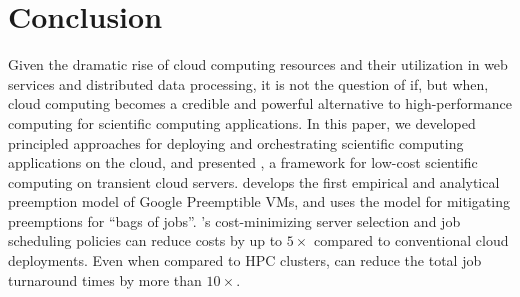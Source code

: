 
\section{Conclusion}
\label{sec:conclusion}
Given the dramatic rise of cloud computing resources and their utilization in web services and distributed data processing, it is not the question of if, but when, cloud computing becomes a credible and powerful alternative to high-performance computing for scientific computing applications. 
In this paper, we developed principled approaches for deploying and orchestrating scientific computing applications on the cloud, and presented \sysname, a framework for low-cost scientific computing on  transient cloud servers. 
\sysname develops the first empirical and analytical preemption model of Google Preemptible VMs, and uses the model for mitigating preemptions for ``bags of jobs''. 
\sysname's cost-minimizing server selection and job scheduling policies can reduce costs by up to $5\times$ compared to conventional cloud deployments.
Even when compared to HPC clusters, \sysname can reduce the total job turnaround times by more than $10\times$. 


